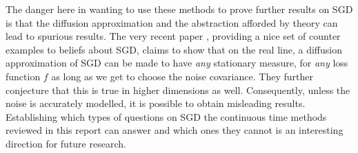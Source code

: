 \documentclass[11pt,twoside]{article}
\theoremstyle{definition}
\begin{document}
The danger here in wanting to use these methods to prove further results on SGD is that the diffusion approximation and the abstraction afforded by theory can lead to spurious results. The very recent paper \cite{ziyin_sgd_2021}, providing a nice set of counter examples to beliefs about SGD, claims to show that on the real line, a diffusion approximation of SGD can be made to have \textit{any} stationary measure, for \textit{any} loss function $f$ as long as we get to choose the noise covariance. They further conjecture that this is true in higher dimensions as well. Consequently, unless the noise is accurately modelled, it is possible to obtain misleading results. Establishing which types of questions on SGD the continuous time methods reviewed in this report can answer and which ones they cannot is an interesting direction for future research. 



\end{document}
